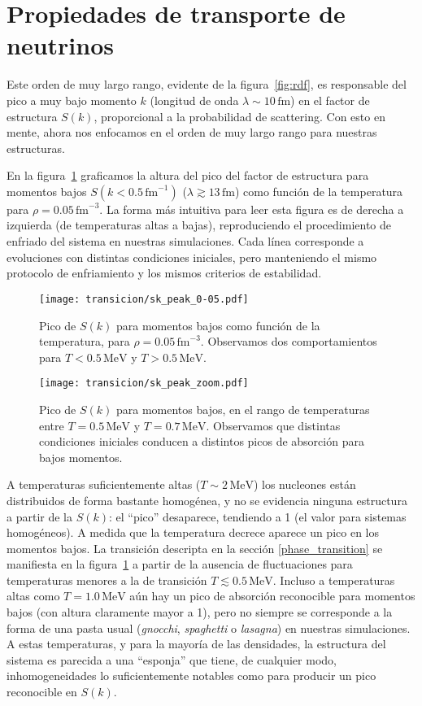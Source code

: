 \section{Propiedades de transporte de neutrinos}
Este orden de muy largo rango, evidente de la figura~\ref{fig:rdf}, es responsable del pico a muy bajo momento $k$ (longitud de onda $\lambda\sim 10\,\text{fm}$) en el factor de estructura $S(k)$, proporcional a la probabilidad de scattering.
Con esto en mente, ahora nos enfocamos en el orden de muy largo rango para nuestras estructuras.

En la figura~\ref{fig:sk_peak_0-05} graficamos la altura del pico del factor de estructura para momentos bajos $S(k<0.5\,\text{fm}^{-1})$ ($\lambda\gtrsim13\,\text{fm}$) como función de la temperatura para $\rho=0.05\,\text{fm}^{-3}$.
La forma más intuitiva para leer esta figura es de derecha a izquierda (de temperaturas altas a bajas), reproduciendo el procedimiento de enfriado del sistema en nuestras simulaciones.
Cada línea corresponde a evoluciones con distintas condiciones iniciales, pero manteniendo el mismo protocolo de enfriamiento y los mismos criterios de estabilidad.

\begin{figure}
  \centering
  \texttt{[image: transicion/sk\_peak\_0-05.pdf]}
  \caption{Pico de $S(k)$ para momentos bajos como función de la temperatura, para $\rho=0.05\,\text{fm}^{-3}$.
    Observamos dos comportamientos para $T<0.5\,\text{MeV}$ y $T>0.5\,\text{MeV}$.  }
  \label{fig:sk_peak_0-05}
\end{figure}

\begin{figure}
  \centering
  \texttt{[image: transicion/sk\_peak\_zoom.pdf]}
  \caption{Pico de $S(k)$ para momentos bajos, en el rango de temperaturas entre $T=0.5\,\text{MeV}$ y $T=0.7\,\text{MeV}$.
    Observamos que distintas condiciones iniciales conducen a distintos picos de absorción para bajos momentos.}
  \label{fig:sk_peak_zoom}
\end{figure}

A temperaturas suficientemente altas ($T\sim 2\,\text{MeV}$) los nucleones están distribuidos de forma bastante homogénea, y no se evidencia ninguna estructura a partir de la $S(k)$: el ``pico'' desaparece, tendiendo a 1 (el valor para sistemas homogéneos).
A medida que la temperatura decrece aparece un pico en los momentos bajos.
La transición descripta en la sección \ref{phase_transition} se manifiesta en la figura~\ref{fig:sk_peak_0-05} a partir de la ausencia de fluctuaciones para temperaturas menores a la de transición $T \lesssim 0.5\,\text{MeV}$.
Incluso a temperaturas altas como
$T=1.0\,\text{MeV}$ aún hay un pico de absorción reconocible para momentos bajos (con altura claramente mayor a 1), pero no siempre se corresponde a la forma de una pasta usual (\emph{gnocchi}, \emph{spaghetti} o
\emph{lasagna}) en nuestras simulaciones.
A estas temperaturas, y para la mayoría de las densidades, la estructura del sistema es parecida a una ``esponja'' que tiene, de cualquier modo, inhomogeneidades lo suficientemente notables como para producir un pico reconocible en $S(k)$.

